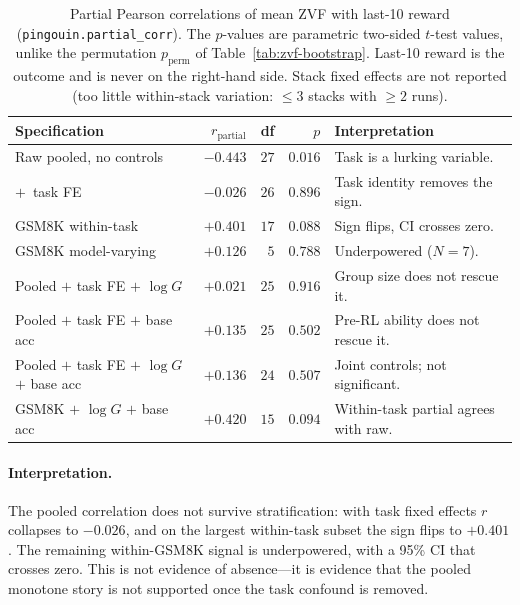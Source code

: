 \begin{table}[htbp]
\centering\small
\begin{tabular}{lrrrl}
\toprule
Specification & $r_{\text{partial}}$ & df & $p$ & Interpretation \\
\midrule
Raw pooled, no controls                          & $-0.443$ & $27$ & $0.016$ & Task is a lurking variable. \\
$+$~task FE                                      & $-0.026$ & $26$ & $0.896$ & Task identity removes the sign. \\
GSM8K within-task                                & $+0.401$ & $17$ & $0.088$ & Sign flips, CI crosses zero. \\
GSM8K model-varying                              & $+0.126$ & $5$  & $0.788$ & Underpowered ($N{=}7$). \\
Pooled $+$ task FE $+$ $\log G$                  & $+0.021$ & $25$ & $0.916$ & Group size does not rescue it. \\
Pooled $+$ task FE $+$ base acc                  & $+0.135$ & $25$ & $0.502$ & Pre-RL ability does not rescue it. \\
Pooled $+$ task FE $+$ $\log G$ $+$ base acc     & $+0.136$ & $24$ & $0.507$ & Joint controls; not significant. \\
GSM8K $+$ $\log G$ $+$ base acc                  & $+0.420$ & $15$ & $0.094$ & Within-task partial agrees with raw. \\
\bottomrule
\end{tabular}
\caption{Partial Pearson correlations of mean ZVF with last-10 reward
(\texttt{pingouin.partial\_corr}). The $p$-values are parametric two-sided
$t$-test values, unlike the permutation $p_{\text{perm}}$ of
Table~\ref{tab:zvf-bootstrap}. Last-10 reward is the outcome and is never
on the right-hand side. Stack fixed effects are not reported (too little
within-stack variation: $\le 3$ stacks with $\ge 2$ runs).}
\label{tab:zvf-partials}
\end{table}

\paragraph{Interpretation.}
The pooled correlation does not survive stratification: with task fixed
effects $r$ collapses to $-0.026$, and on the largest within-task subset the
sign flips to $+0.401$. The remaining within-GSM8K signal is underpowered,
with a 95\% CI that crosses zero. This is not evidence of absence---it is
evidence that the pooled monotone story is not supported once the task
confound is removed.
